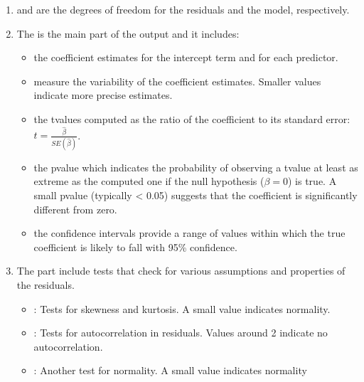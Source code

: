 \documentclass[letterpaper,10pt,english]{jupyterBook}
\begin{document}
\begin{enumerate}
\item {} 
\sphinxAtStartPar
{} and  are the degrees of freedom for the residuals and the model, respectively.

\item {} 
\sphinxAtStartPar
The  is the main part of the output and it includes:
\begin{itemize}
\item {} 
\sphinxAtStartPar
{} the coefficient estimates for the intercept term and for each predictor.

\item {} 
\sphinxAtStartPar
{} measure the variability of the coefficient estimates. Smaller values indicate more precise estimates.

\item {} 
\sphinxAtStartPar
{} the t\sphinxhyphen{}values computed as the ratio of the coefficient to its standard error: \(t = \frac{\hat{\beta}}{SE(\hat{\beta})}\).

\item {} 
\sphinxAtStartPar
{} the p\sphinxhyphen{}value which indicates the probability of observing a t\sphinxhyphen{}value at least as extreme as the computed one if the null hypothesis (\(\beta = 0\)) is true. A small p\sphinxhyphen{}value (typically < 0.05) suggests that the coefficient is significantly different from zero.

\item {} 
\sphinxAtStartPar
\sphinxcode{\sphinxupquote{{[}0.025 0.975{]}}} the confidence intervals provide a range of values within which the true coefficient is likely to fall with 95\% confidence.

\end{itemize}

\item {} 
\sphinxAtStartPar
The  part include tests that check for various assumptions and properties of the residuals.
\begin{itemize}
\item {} 
\sphinxAtStartPar
{}: Tests for skewness and kurtosis. A small value indicates normality.

\item {} 
\sphinxAtStartPar
{}: Tests for autocorrelation in residuals. Values around 2 indicate no autocorrelation.

\item {} 
\sphinxAtStartPar
{}: Another test for normality. A small value indicates normality

\end{itemize}

\end{enumerate}
\end{document}
